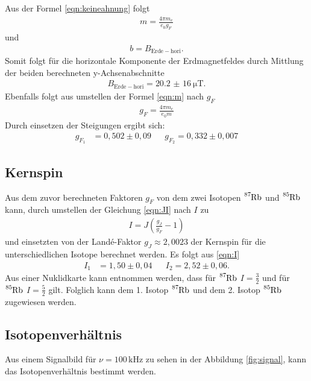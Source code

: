 Aus der Formel \eqref{eqn:keineahnung} folgt
\begin{align}
m=\frac{4\pi m_e}{e_0 g_F} \label{eqn:m}
\end{align}
und
\begin{align*}
b=B_\mathrm{Erde-hori}.
\end{align*}
Somit folgt für die horizontale Komponente der Erdmagnetfeldes durch Mittlung der
beiden berechneten y-Achsenabschnitte
\begin{align*}
B_\mathrm{Erde-hori}=\SI{20,2(16)}{\micro\tesla}.
\end{align*}
Ebenfalls folgt aus umstellen der Formel \eqref{eqn:m} nach $g_F$
\begin{align}
  g_F=\frac{4\pi m_e}{e_0 m} \label{eqn:g_f}
\end{align}
Durch einsetzen der Steigungen ergibt sich:
\begin{align*}
  g_{F_1} & =0,502\pm0,09 &  & g_{F_2}=0,332\pm0,007
\end{align*}

\subsection{Kernspin}
Aus dem zuvor berechneten Faktoren $g_F$ von dem zwei Isotopen $\ce{^{87}Rb}$ und $\ce{^{85}Rb}$ kann,
durch umstellen der Gleichung \eqref{eqn:JI}
nach $I$ zu
\begin{align}
  I=J\left( \frac{g_J}{g_F}-1\right) \label{eqn:I}
\end{align}
und einsetzten von der Landé-Faktor $g_J\approx2,0023$ der Kernspin für die
unterschiedlichen Isotope berechnet werden.
Es folgt aus \eqref{eqn:I}
\begin{align*}
  I_1&=1,50\pm0,04&   &I_2=2,52\pm0,06.
\end{align*}
Aus einer Nuklidkarte \cite{verhalt} kann entnommen werden, dass für
$\ce{^{87}Rb}$ $I=\frac{3}{2}$
und  für $\ce{^{85}Rb}$ $I=\frac{5}{2}$ gilt.
Folglich kann dem 1. Isotop $\ce{^{87}Rb}$ und dem  2. Isotop $\ce{^{85}Rb}$
zugewiesen werden.
\subsection{Isotopenverhältnis}
Aus einem Signalbild für $\nu=100\,\si{\kilo\hertz}$
zu sehen in der Abbildung \ref{fig:signal},
kann das Isotopenverhältnis bestimmt werden.

